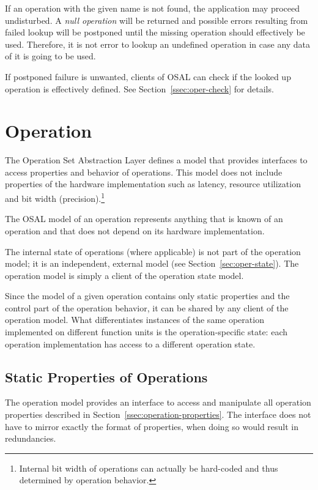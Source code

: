 \documentclass[twoside]{tce}
\begin{document}
If an operation with the given name is not found, the application may
proceed undisturbed.  A \emph{null operation} will be returned and possible
errors resulting from failed lookup will be postponed until the missing
operation should effectively be used.  Therefore, it is not error to lookup
an undefined operation in case any data of it is going to be used.

If postponed failure is unwanted, clients of OSAL can check if the looked up
operation is effectively defined.  See Section~\ref{ssec:oper-check} for
details.

\section{Operation}
\label{sec:operation-if}

The Operation Set Abstraction Layer defines a model that provides interfaces
to access properties and behavior of operations.  This model does not
include properties of the hardware implementation such as latency, resource
utilization and bit width (precision).\footnote{
%
  Internal bit width of operations can actually be hard-coded and thus
  determined by operation behavior.}

The OSAL model of an operation represents anything that is known of an
operation and that does not depend on its hardware implementation.

The internal state of operations (where applicable) is not part of the
operation model; it is an independent, external model (see
Section~\ref{sec:oper-state}).  The operation model is simply a client of
the operation state model.

Since the model of a given operation contains only static properties and the
control part of the operation behavior, it can be shared by any client of
the operation model.  What differentiates instances of the same operation
implemented on different function units is the operation-specific state:
each operation implementation has access to a different operation state.

\subsection{Static Properties of Operations}
\label{ssec:oper-info}

The operation model provides an interface to access and manipulate all
operation properties described in Section~\ref{ssec:operation-properties}.
The interface does not have to mirror exactly the format of properties, when
doing so would result in redundancies.
\end{document}
